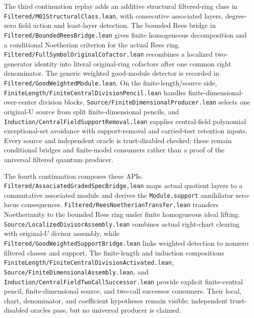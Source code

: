 \documentclass[10pt,a4paper]{article}
\newcommand{\lean}[1]{\nolinkurl{#1}}
\begin{document}
The third continuation replay adds an additive structural filtered-ring class
in \lean{Filtered/M01StructuralClass.lean}, with consecutive associated
layers, degree-zero field action and least-layer detection. The bounded Rees
bridge in \lean{Filtered/BoundedReesBridge.lean} gives finite homogeneous
decomposition and a conditional Noetherian criterion for the actual Rees ring.
\lean{Filtered/FullSymbolOriginalCofactor.lean} recombines a localized
two-generator identity into literal original-ring cofactors after one common
right denominator. The generic weighted good-module detector is recorded in
\lean{Filtered/GoodWeightedModule.lean}. On the finite-length/source side,
\lean{FiniteLength/FiniteCentralDivisionPencil.lean} handles
finite-dimensional-over-center division blocks,
\lean{Source/FiniteDimensionalProducer.lean} selects one original-U source
from split finite-dimensional pencils, and
\lean{Induction/CentralFieldSupportRemoval.lean} supplies central-field
polynomial exceptional-set avoidance with support-removal and carried-test
retention inputs. Every source and independent oracle is trust-disabled
checked; these remain conditional bridges and finite-model consumers rather
than a proof of the universal filtered quantum producer.

The fourth continuation composes these APIs. \lean{Filtered/AssociatedGradedSpecBridge.lean}
maps actual quotient layers to a commutative associated module and derives
the \lean{Module.support} annihilator zero-locus consequences.
\lean{Filtered/ReesNoetherianTransfer.lean} transfers Noetherianity to the
bounded Rees ring under finite homogeneous ideal lifting.
\lean{Source/LocalizedDivisorAssembly.lean} combines actual right-chart
clearing with original-\(U\) divisor assembly, while
\lean{Filtered/GoodWeightedSupportBridge.lean} links weighted detection to
nonzero filtered classes and support. The finite-length and induction
compositions \lean{FiniteLength/FiniteCentralDivisionActivated.lean},
\lean{Source/FiniteDimensionalAssembly.lean}, and
\lean{Induction/CentralFieldTwoCallSuccessor.lean} provide explicit
finite-central pencil, finite-dimensional source, and two-call successor
consumers. Their local, chart, denominator, and coefficient hypotheses remain
visible; independent trust-disabled oracles pass, but no universal producer is
claimed.
\end{document}

